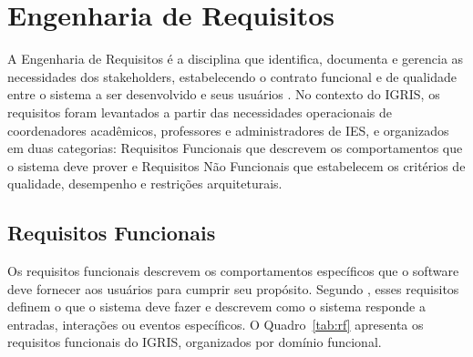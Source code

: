 \section{Engenharia de Requisitos}
\label{sec:3.3}

A Engenharia de Requisitos é a disciplina que identifica, documenta e gerencia as necessidades dos stakeholders, estabelecendo o contrato funcional e de qualidade entre o sistema a ser desenvolvido e seus usuários \cite[p.~83]{sommerville2016}. No contexto do IGRIS, os requisitos foram levantados a partir das necessidades operacionais de coordenadores acadêmicos, professores e administradores de IES, e organizados em duas categorias: Requisitos Funcionais que descrevem os comportamentos que o sistema deve prover e Requisitos Não Funcionais que estabelecem os critérios de qualidade, desempenho e restrições arquiteturais.

\subsection{Requisitos Funcionais}
\label{subsec:3.3.1}

Os requisitos funcionais descrevem os comportamentos específicos que o software deve fornecer aos usuários para cumprir seu propósito. Segundo , esses requisitos definem o que o sistema deve fazer e descrevem como o sistema responde a entradas, interações ou eventos específicos. O Quadro~\ref{tab:rf} apresenta os requisitos funcionais do IGRIS, organizados por domínio funcional.



